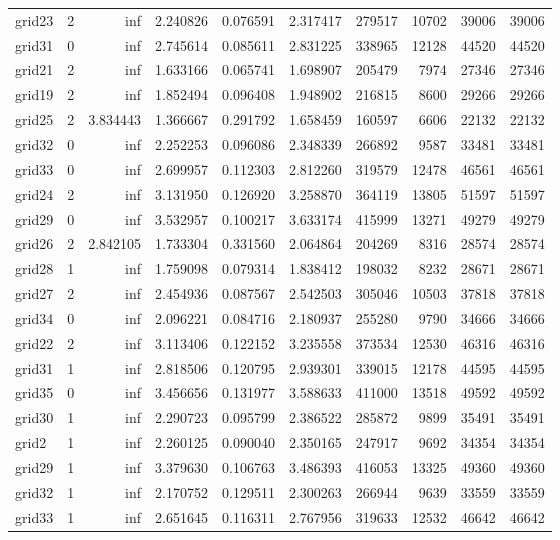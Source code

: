 \begin{longtable}{|l|r|r|r|r|r|r|r|r|r|}
grid23 & 2 & inf & 2.240826 & 0.076591 & 2.317417 & 279517 & 10702 & 39006 & 39006 \\
grid31 & 0 & inf & 2.745614 & 0.085611 & 2.831225 & 338965 & 12128 & 44520 & 44520 \\
grid21 & 2 & inf & 1.633166 & 0.065741 & 1.698907 & 205479 & 7974 & 27346 & 27346 \\
grid19 & 2 & inf & 1.852494 & 0.096408 & 1.948902 & 216815 & 8600 & 29266 & 29266 \\
grid25 & 2 & 3.834443 & 1.366667 & 0.291792 & 1.658459 & 160597 & 6606 & 22132 & 22132 \\
grid32 & 0 & inf & 2.252253 & 0.096086 & 2.348339 & 266892 & 9587 & 33481 & 33481 \\
grid33 & 0 & inf & 2.699957 & 0.112303 & 2.812260 & 319579 & 12478 & 46561 & 46561 \\
grid24 & 2 & inf & 3.131950 & 0.126920 & 3.258870 & 364119 & 13805 & 51597 & 51597 \\
grid29 & 0 & inf & 3.532957 & 0.100217 & 3.633174 & 415999 & 13271 & 49279 & 49279 \\
grid26 & 2 & 2.842105 & 1.733304 & 0.331560 & 2.064864 & 204269 & 8316 & 28574 & 28574 \\
grid28 & 1 & inf & 1.759098 & 0.079314 & 1.838412 & 198032 & 8232 & 28671 & 28671 \\
grid27 & 2 & inf & 2.454936 & 0.087567 & 2.542503 & 305046 & 10503 & 37818 & 37818 \\
grid34 & 0 & inf & 2.096221 & 0.084716 & 2.180937 & 255280 & 9790 & 34666 & 34666 \\
grid22 & 2 & inf & 3.113406 & 0.122152 & 3.235558 & 373534 & 12530 & 46316 & 46316 \\
grid31 & 1 & inf & 2.818506 & 0.120795 & 2.939301 & 339015 & 12178 & 44595 & 44595 \\
grid35 & 0 & inf & 3.456656 & 0.131977 & 3.588633 & 411000 & 13518 & 49592 & 49592 \\
grid30 & 1 & inf & 2.290723 & 0.095799 & 2.386522 & 285872 & 9899 & 35491 & 35491 \\
grid2 & 1 & inf & 2.260125 & 0.090040 & 2.350165 & 247917 & 9692 & 34354 & 34354 \\
grid29 & 1 & inf & 3.379630 & 0.106763 & 3.486393 & 416053 & 13325 & 49360 & 49360 \\
grid32 & 1 & inf & 2.170752 & 0.129511 & 2.300263 & 266944 & 9639 & 33559 & 33559 \\
grid33 & 1 & inf & 2.651645 & 0.116311 & 2.767956 & 319633 & 12532 & 46642 & 46642 \\

\end{longtable}
